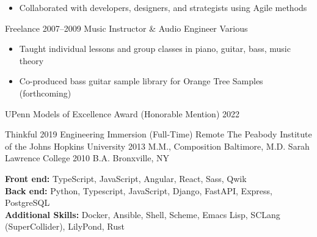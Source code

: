 \documentclass{article}
\begin{document}
\begin{itemize}[leftmargin=0em, label={}]
\begin{itemize}
          \item \small Collaborated with developers, designers, and strategists
            using Agile methods
        \end{itemize}
    \experience
        {Freelance}
        {2007--2009}
        {Music Instructor \& Audio Engineer}
        {Various}
        \begin{itemize}
          \item \small Taught individual lessons and group classes in piano,
            guitar, bass, music theory
          \item \small Co-produced bass guitar sample library for Orange Tree
            Samples (forthcoming)
        \end{itemize}
\end{itemize}


\begin{itemize}[leftmargin=0em, label={}]
  \award
      {UPenn Models of Excellence Award (Honorable Mention)}
      {2022}
\end{itemize}


\begin{itemize}[leftmargin=0em, label={}]
    \experience
        {Thinkful}
        {2019}
        {Engineering Immersion (Full-Time)}
        {Remote}
    \experience
        {The Peabody Institute of the Johns Hopkins University}
        {2013}
        {M.M., Composition}
        {Baltimore, M.D.}
    \experience
        {Sarah Lawrence College}
        {2010}
        {B.A.}
        {Bronxville, NY}
\end{itemize}


\textbf{Front end:} TypeScript, JavaScript, Angular, React, Sass, Qwik \\
\textbf{Back end:} Python, Typescript, JavaScript, Django, FastAPI, Express,
  PostgreSQL \\
\textbf{Additional Skills:} Docker, Ansible, Shell, Scheme, Emacs Lisp, SCLang
  (SuperCollider), LilyPond, Rust
\end{document}
